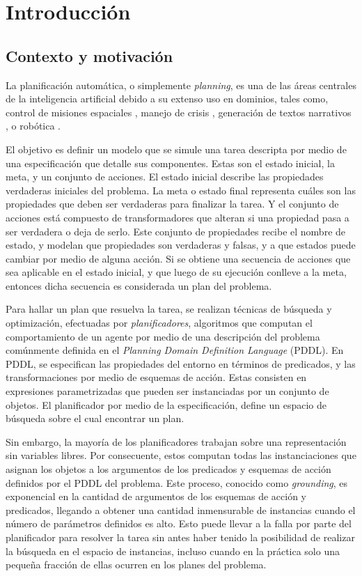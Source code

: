 \chapter{Introducción}
\label{ch:into}

\section{Contexto y motivación}
La planificación automática, o simplemente \emph{planning}, es una de las áreas
centrales de la inteligencia artificial debido a su extenso uso en dominios,
tales como, control de misiones espaciales \citep{RabideauG-et-al-2001}, manejo
de crisis \citep{Bienkowki-1995}, generación de textos narrativos
\citep{Goudoulakis-et-al-2016}, o robótica \citep{Munoz-et-al-2016}.

El objetivo es definir un modelo que se simule una tarea descripta por medio de una especificación que detalle sus componentes. Estas son el estado inicial, la meta, y un
conjunto de acciones. El estado inicial describe las propiedades verdaderas iniciales del problema. La meta o estado final representa cuáles son
las propiedades que deben ser verdaderas para finalizar la tarea. Y el conjunto de acciones está compuesto de
transformadores que alteran si una propiedad pasa a ser verdadera o deja de serlo. Este conjunto de propiedades recibe el nombre de estado, y modelan que propiedades son verdaderas y falsas, y a que estados puede cambiar por medio de alguna acción. Si se obtiene
una secuencia de acciones que sea aplicable en el estado inicial, y que luego de
su ejecución conlleve a la meta, entonces dicha secuencia es considerada un plan
del problema.

Para hallar un plan que resuelva la tarea, se realizan técnicas de búsqueda y
optimización, efectuadas por \emph{planificadores}, algoritmos que computan el
comportamiento de un agente por medio de una descripción del problema comúnmente
definida en el \emph{Planning Domain Definition Language} (PDDL). En PDDL, se
especifican las propiedades del entorno en términos de predicados, y las
transformaciones por medio de esquemas de acción. Estas consisten en expresiones
parametrizadas que pueden ser instanciadas por un conjunto de objetos. El
planificador por medio de la especificación, define un espacio de búsqueda sobre
el cual encontrar un plan.

Sin embargo, la mayoría de los planificadores trabajan sobre una representación
sin variables libres. Por consecuente, estos computan todas las instanciaciones
que asignan los objetos a los argumentos de los predicados y esquemas de acción
definidos por el PDDL del problema. Este proceso, conocido como
\emph{grounding}, es exponencial en la cantidad de argumentos de los esquemas de
acción y predicados, llegando a obtener una cantidad inmensurable de instancias
cuando el número de parámetros definidos es alto. Esto puede llevar a la falla
por parte del planificador para resolver la tarea sin antes haber tenido la
posibilidad de realizar la búsqueda en el espacio de instancias, incluso cuando
en la práctica solo una pequeña fracción de ellas ocurren en los planes del
problema.
\citep{Gnad_Torralba_Dominguez_Areces_Bustos_2019}


